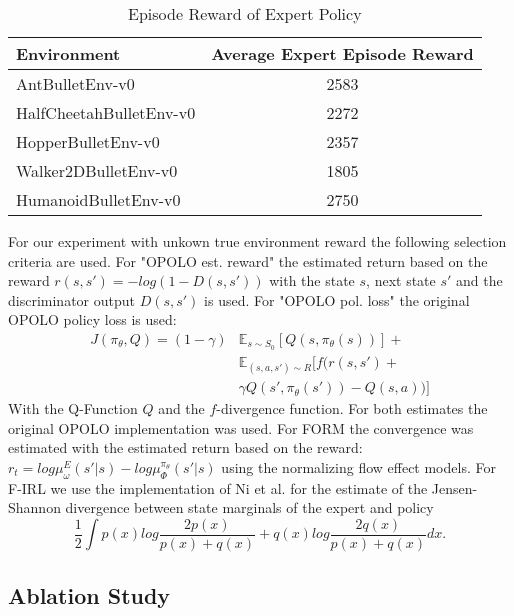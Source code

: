 \documentclass{article}
\begin{document}
\begin{table}[ht]
	\renewcommand{\arraystretch}{1.3}
	\centering
	\caption{Episode Reward of Expert Policy}\label{tb:expertR}
	\begin{small}
	\begin{tabular}{l|c}
		Environment & Average Expert Episode Reward \\\hline
		AntBulletEnv-v0 & 2583 \\
		HalfCheetahBulletEnv-v0 & 2272  \\
		HopperBulletEnv-v0 & 2357 \\
		Walker2DBulletEnv-v0 & 1805 \\
		HumanoidBulletEnv-v0 & 2750 \\
	\end{tabular}
	\end{small}
\end{table}

For our experiment with unkown true environment reward
the following selection criteria are used. For "OPOLO est. reward" the estimated return based on the reward $r(s,s')=-log(1-D(s,s'))$ with the state $s$, next state $s'$ and the discriminator output $D(s,s')$ is used. For "OPOLO pol. loss" the original OPOLO policy loss is used: 
\begin{equation}
\begin{aligned}
   J(\pi_{\theta}, Q) =  (1-\gamma) & \mathbb{E}_{s\sim S_0}[Q(s,\pi_{\theta}(s))] + \\
   & \mathbb{E}_{(s,a,s')\sim R}[f(r(s,s')+ \\
   & \gamma Q(s',\pi_{\theta}(s'))-Q(s,a))]
\end{aligned}
\end{equation}
With the Q-Function $Q$ and the $f$-divergence function. For both estimates the original OPOLO implementation was used. For FORM the convergence was estimated with the estimated return based on the reward: $ r_t = log \mu^E_{\omega}(s'|s) - log \mu^{\pi_{\theta}}_{\Phi}(s'|s) $ using the normalizing flow effect models. For F-IRL we use the implementation of Ni et al.  for the estimate of the Jensen-Shannon divergence between state marginals of the expert and policy
\begin{equation*}
\frac{1}{2}\int p(x)log\frac{2p(x)}{p(x)+q(x)}+q(x)log\frac{2q(x)}{p(x)+q(x)}dx.
\end{equation*}


\subsection{Ablation Study}\label{sec:ablStud}
\end{document}
